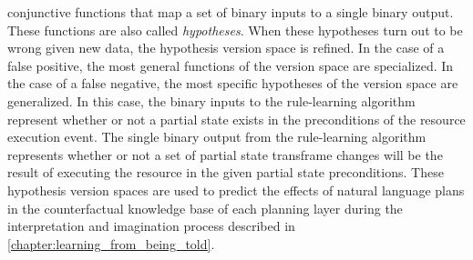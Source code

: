 conjunctive functions that map a set of binary inputs to a single
binary output.  These functions are also called {\emph{hypotheses}}.
When these hypotheses turn out to be wrong given new data, the
hypothesis version space is refined.  In the case of a false positive,
the most general functions of the version space are specialized.  In
the case of a false negative, the most specific hypotheses of the
version space are generalized.  In this case, the binary inputs to the
rule-learning algorithm represent whether or not a partial state
exists in the preconditions of the resource execution event.  The
single binary output from the rule-learning algorithm represents
whether or not a set of partial state transframe changes will be the
result of executing the resource in the given partial state
preconditions.  These hypothesis version spaces are used to predict
the effects of natural language plans in the counterfactual knowledge
base of each planning layer during the interpretation and imagination
process described in
{\mbox{\autoref{chapter:learning_from_being_told}}}.

